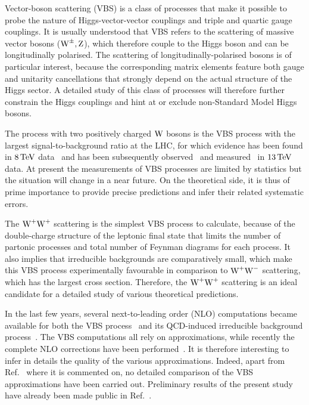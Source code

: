 Vector-boson scattering (VBS) is a class of processes that make it possible 
to probe the nature of Higgs-vector-vector couplings and triple and quartic gauge couplings.
It is usually understood that VBS refers to the scattering of massive vector bosons ($\text{W}^\pm,\text{Z}$), which therefore couple to the Higgs boson and can be longitudinally polarised.
The scattering of longitudinally-polarised bosons is of particular interest, because the corresponding matrix elements feature both gauge and unitarity cancellations that strongly depend on the actual structure of the Higgs sector.
A detailed study of this class of processes will therefore further constrain the Higgs couplings and hint at or exclude non-Standard Model Higgs bosons.

The process with two positively charged $\text{W}$ bosons is the VBS process with the largest signal-to-background ratio at the LHC, for which evidence has been found in $8 \,\text{TeV}$ data~\cite{Aad:2014zda,Khachatryan:2014sta} and has been subsequently
observed~\cite{Sirunyan:2017ret} and measured~\cite{Aaboud:2016ffv} in $13\,\text{TeV}$ data. At present 
the measurements of VBS processes are limited by statistics but the situation will change in a near future.
On the theoretical side, it is thus of prime importance to provide precise predictions and infer their related systematic errors.

The $\text{W}^+\text{W}^+$ scattering is the simplest VBS process to calculate, because of the double-charge structure of the leptonic final state that limits the number of partonic processes and total number of Feynman diagrams for each process.
It also implies that irreducible backgrounds are comparatively small, which make this VBS process experimentally favourable in comparison to \eg $\text{W}^+\text{W}^-$ scattering, which has the largest cross section.
Therefore, the $\text{W}^+\text{W}^+$ scattering is an ideal candidate for a detailed study of various theoretical predictions.

In the last few years, several next-to-leading order (NLO) computations became available for both the VBS process~\cite{Jager:2006zc,Jager:2006cp,Bozzi:2007ur,Jager:2009xx,Jager:2011ms,Denner:2012dz,Rauch:2016pai} and its QCD-induced irreducible background process~\cite{Rauch:2016pai,Melia:2010bm,Melia:2011gk,Campanario:2013gea,Baglio:2014uba}.
The VBS computations all rely on approximations, while recently the complete NLO corrections have been performed~\cite{Biedermann:2017bss}.
It is therefore interesting to infer in details the quality of the various approximations.
Indeed, apart from Ref.~\cite{Biedermann:2017bss} where it is commented on,  no detailed comparison of the VBS approximations have been carried out.
Preliminary results of the present study have already been made public in Ref.~\cite{Anders:2018gfr}.

